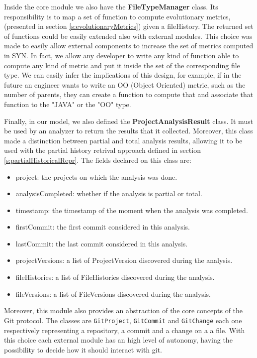 Inside the core module we also have the \textbf{FileTypeManager} class. Its responsibility is to map a set of function to compute evolutionary metrics, (presented in section \ref{s:evolutionaryMetrics}) given a fileHistory. The returned set of functions could be easily extended also with external modules. This choice was made to easily allow external components to increase the set of metrics computed in SYN. In fact, we allow any developer to write any kind of function able to compute any kind of metric and put it inside the set of the corresponding file type. 
We can easily infer the implications of this design, for example, if in the future an engineer wants to write an OO (Object Oriented) metric, such as the number of parents, they can create a function to compute that and associate that function to the "JAVA" or the "OO" type. 
\bigbreak

Finally, in our model, we also defined the \textbf{ProjectAnalysisResult} class. It must be used by an analyzer to return the results that it collected. Moreover, this class made a distinction between partial and total analysis results, allowing it to be used with the partial history retrival approach defined in section \ref{s:partialHistoricalRepr}. The fields declared on this class are:
\begin{itemize}
    \item project: the projects on which the analysis was done.
    \item analysisCompleted: whether if the analysis is partial or total.
    \item timestamp: the timestamp of the moment when the analysis was completed. 
    \item firstCommit: the first commit considered in this analysis. 
    \item lastCommit: the last commit considered in this analysis. 
    \item projectVersions: a list of ProjectVersion discovered during the analysis.
    \item fileHistories: a list of FileHistories discovered during the analysis.
    \item fileVersions: a list of FileVersions discovered during the analysis.
\end{itemize}

Moreover, this module also provides an abstraction of the core concepts of the Git protocol. The classes are \texttt{GitProject}, \texttt{GitCommit} and \texttt{GitChange} each one respectively representing a repository, a commit and a change on a a file. 
With this choice each external module has an high level of autonomy, having the possibility to decide how it should interact with git. 


